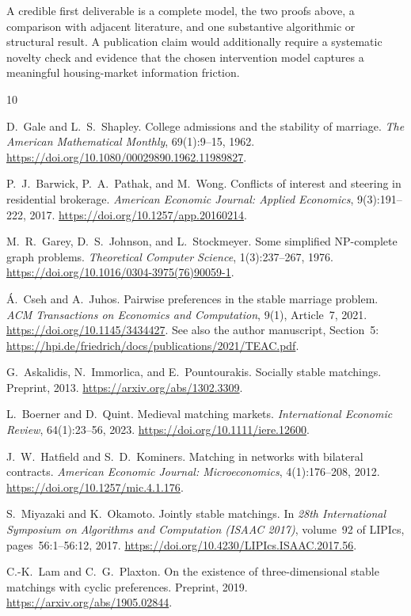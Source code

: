 \documentclass[11pt,letterpaper]{article}
\theoremstyle{definition}
\theoremstyle{remark}
\begin{document}
A credible first deliverable is a complete model, the two proofs above, a
comparison with adjacent literature, and one substantive algorithmic or
structural result. A publication claim would additionally require a systematic
novelty check and evidence that the chosen intervention model captures a
meaningful housing-market information friction.

\begin{thebibliography}{10}
\small

D.~Gale and L.~S.~Shapley.
College admissions and the stability of marriage.
\emph{The American Mathematical Monthly}, 69(1):9--15, 1962.
\url{https://doi.org/10.1080/00029890.1962.11989827}.

P.~J.~Barwick, P.~A.~Pathak, and M.~Wong.
Conflicts of interest and steering in residential brokerage.
\emph{American Economic Journal: Applied Economics}, 9(3):191--222, 2017.
\url{https://doi.org/10.1257/app.20160214}.

M.~R.~Garey, D.~S.~Johnson, and L.~Stockmeyer.
Some simplified NP-complete graph problems.
\emph{Theoretical Computer Science}, 1(3):237--267, 1976.
\url{https://doi.org/10.1016/0304-3975(76)90059-1}.

\'{A}.~Cseh and A.~Juhos.
Pairwise preferences in the stable marriage problem.
\emph{ACM Transactions on Economics and Computation}, 9(1), Article~7, 2021.
\url{https://doi.org/10.1145/3434427}.
See also the author manuscript, Section~5:
\url{https://hpi.de/friedrich/docs/publications/2021/TEAC.pdf}.

G.~Askalidis, N.~Immorlica, and E.~Pountourakis.
Socially stable matchings.
Preprint, 2013.
\url{https://arxiv.org/abs/1302.3309}.

L.~Boerner and D.~Quint.
Medieval matching markets.
\emph{International Economic Review}, 64(1):23--56, 2023.
\url{https://doi.org/10.1111/iere.12600}.

J.~W.~Hatfield and S.~D.~Kominers.
Matching in networks with bilateral contracts.
\emph{American Economic Journal: Microeconomics}, 4(1):176--208, 2012.
\url{https://doi.org/10.1257/mic.4.1.176}.

S.~Miyazaki and K.~Okamoto.
Jointly stable matchings.
In \emph{28th International Symposium on Algorithms and Computation
(ISAAC 2017)}, volume~92 of LIPIcs, pages~56:1--56:12, 2017.
\url{https://doi.org/10.4230/LIPIcs.ISAAC.2017.56}.

C.-K.~Lam and C.~G.~Plaxton.
On the existence of three-dimensional stable matchings with cyclic preferences.
Preprint, 2019.
\url{https://arxiv.org/abs/1905.02844}.

\end{thebibliography}
\end{document}

